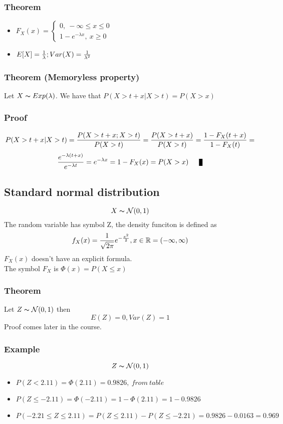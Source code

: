 \documentclass{article}
\newcommand{\N}{{\mathcal{N}}}
\begin{document}
\subsubsection{Theorem}
\begin{itemize}
    \item $ F_X(x) = \begin{cases} 
      0,\ -\infty\le x\le 0\\
      1-e^{-\lambda x},\ x\ge 0
    \end{cases} $
  \item $ E[X] = \frac{1}{\lambda}; Var(X) = \frac{1}{\lambda^2}$
\end{itemize}

\subsubsection{Theorem (Memoryless property)}
Let $X\thicksim Exp(\lambda)$. We have that $P(X>t+x | X>t) = P(X>x)$
\subsubsection{Proof}
$$P(X>t+x | X>t) = \frac{P(X>t+x ; X>t)}{P(X>t)} = \frac{P(X>t+x)}{P(X>t)} = \frac{1-F_X(t+x)}{1-F_X(t)} =$$
$$\f{e^{-\lambda (t+x)}}{e^{-\lambda t}} = e^{-\lambda x} = 1-F_X(x) = P(X>x) \qed$$

\subsection{Standard normal distribution}
$$ X\thicksim \N(0, 1) $$
The random variable has symbol Z, the density funciton is defined as 
$$ f_X(x) = \frac{1}{\sqrt{2\pi}}e^{-\frac{x^2}{2}}, x\in {\mathbb R} = (-\infty, \infty) $$
$F_X(x)$ doesn't have an explicit formula.\\
The symbol $F_X$ is $\Phi(x) = P(X\le x)$

\subsubsection{Theorem}
Let $ Z\thicksim \N(0, 1) $ then
$$ E(Z) = 0, Var(Z)=1 $$
Proof comes later in the course.

\subsubsection{Example}
$$ Z\thicksim \N(0, 1) $$
\begin{itemize}
    \item $ P(Z<2.11) = \Phi(2.11) = 0.9826,\ from\ table $
      \item $ P(Z\le -2.11) = \Phi(-2.11) = 1-\Phi(2.11) = 1 - 0.9826 $
        \item $ P(-2.21\le Z\le 2.11) = P(Z\le 2.11) - P(Z\le -2.21) = 0.9826  - 0.0163 = 0.969 $
\end{itemize}
\end{document}

